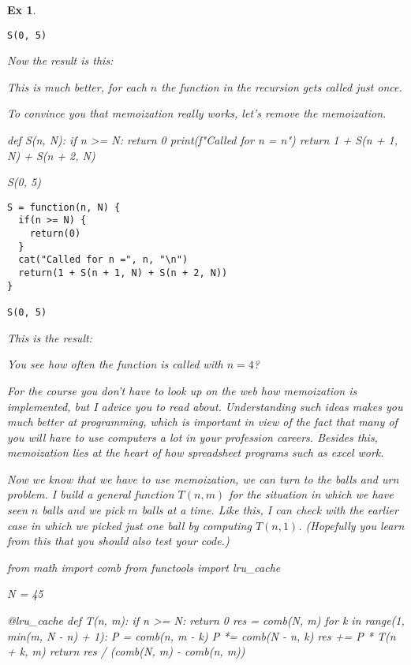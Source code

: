 \documentclass[a4paper,11pt]{article}
\newtheorem{exercise}[theorem]{Ex}
\begin{document}
\begin{exercise}
\begin{solution}
\begin{verbatim}
S(0, 5)
\end{verbatim}
Now the result is this:
\begin{center}
\printpythontex
\end{center}
This is much better, for each $n$ the function in the recursion gets called just once.

To convince you that memoization really works, let's remove the memoization.
\begin{pyblock}
def S(n, N):
    if n >= N:
        return 0
    print(f"Called for n = {n}\n")
    return 1 + S(n + 1, N) + S(n + 2, N)


S(0, 5)
\end{pyblock}
\begin{verbatim}
S = function(n, N) {
  if(n >= N) {
    return(0)
  }
  cat("Called for n =", n, "\n")
  return(1 + S(n + 1, N) + S(n + 2, N))
}

S(0, 5)
\end{verbatim}
This is the result:
\begin{center}
\printpythontex
\end{center}
You see how often the function is called with $n=4$?



For the course you don't have to look up on the web how memoization is implemented, but I advice you to read about.
Understanding such ideas makes you much better at programming, which is important in view of the fact that many of you will have to use computers a lot in your profession careers.
Besides this, memoization lies at the heart of how spreadsheet programs such as excel work.

Now we know that we have to use memoization, we can turn to the balls and urn problem.
I build a general function $T(n,m)$ for the situation in which we have seen $n$ balls and we pick $m$ balls at a time.
Like this, I can check with the earlier case in which we picked just one ball by computing $T(n, 1)$.
(Hopefully you learn from this that you should also test your code.)


\begin{pyblock}
from math import comb
from functools import lru_cache

N = 45


@lru_cache
def T(n, m):
    if n >= N:
        return 0
    res = comb(N, m)
    for k in range(1, min(m, N - n) + 1):
        P = comb(n, m - k)
        P *= comb(N - n, k)
        res += P * T(n + k, m)
    return res / (comb(N, m) - comb(n, m))


\end{pyblock}
\end{solution}
\end{exercise}
\end{document}
